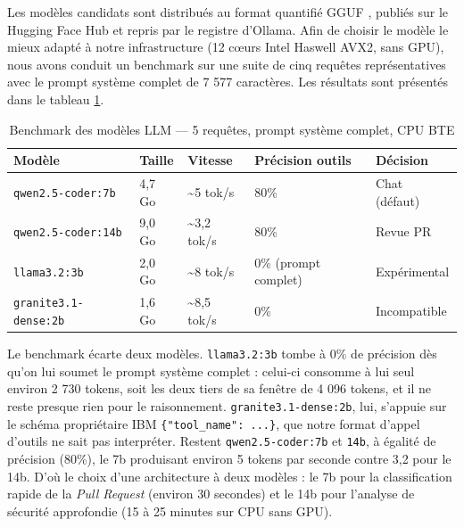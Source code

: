         Les modèles candidats sont distribués au format quantifié GGUF \cite{GGUF},
        publiés sur le Hugging Face Hub \cite{HuggingFaceHub} et repris par le registre
        d'Ollama. Afin de choisir le modèle le mieux adapté à notre infrastructure
        (12 cœurs Intel Haswell AVX2, sans GPU), nous avons conduit un benchmark sur une
        suite de cinq requêtes représentatives avec le prompt système complet de
        7 577 caractères. Les
        résultats sont présentés dans le tableau \ref{tab:llm_benchmark}.

        \begin{table}[H]
        \centering
        \begin{tabular}{|m{4cm}|m{1.8cm}|m{2cm}|m{2.5cm}|m{2.5cm}|}
        \hline
        \textbf{Modèle} & \textbf{Taille} & \textbf{Vitesse} & \textbf{Précision outils} & \textbf{Décision} \\
        \hline
        \texttt{qwen2.\allowbreak{}5-coder:7b} & 4,7 Go & \textasciitilde5 tok/s & 80\% & Chat (défaut) \\
        \hline
        \texttt{qwen2.\allowbreak{}5-coder:14b} & 9,0 Go & \textasciitilde3,2 tok/s & 80\% & Revue PR \\
        \hline
        \texttt{llama3.2:3b} & 2,0 Go & \textasciitilde8 tok/s & 0\% (prompt complet) & Expérimental \\
        \hline
        \texttt{granite3.\allowbreak{}1-dense:2b} & 1,6 Go & \textasciitilde8,5 tok/s & 0\% & Incompatible \\
        \hline
        \end{tabular}
        \caption{Benchmark des modèles LLM — 5 requêtes, prompt système complet, CPU BTE}
        \label{tab:llm_benchmark}
        \end{table}

        Le benchmark écarte deux modèles. \texttt{llama3.2:3b} tombe à 0\% de
        précision dès qu'on lui soumet le prompt système complet : celui-ci consomme à lui
        seul environ 2 730 tokens, soit les deux tiers de sa fenêtre de 4 096 tokens, et il
        ne reste presque rien pour le raisonnement. \texttt{granite3.\allowbreak{}1-dense:2b}, lui,
        s'appuie sur le schéma propriétaire IBM \texttt{\{"tool\_\allowbreak{}name": .\allowbreak{}.\allowbreak{}.\allowbreak{}\}}, que
        notre format d'appel d'outils ne sait pas interpréter. Restent
        \texttt{qwen2.\allowbreak{}5-coder:7b} et \texttt{14b}, à égalité de précision (80\%), le 7b
        produisant environ 5 tokens par seconde contre 3,2 pour le 14b. D'où le choix
        d'une architecture à deux modèles :
        le 7b pour la classification rapide de la \textit{Pull Request} (environ
        30 secondes) et le 14b pour l'analyse de sécurité approfondie (15 à 25 minutes
        sur CPU sans GPU).

